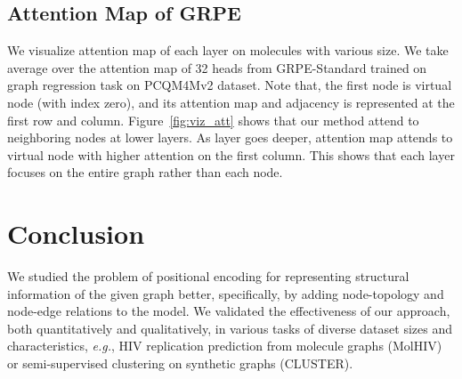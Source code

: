 \documentclass[letterpaper]{article} \usepackage{aaai23}  \usepackage{times}  \usepackage{helvet}  \usepackage{courier}  \usepackage[hyphens]{url}  \usepackage{graphicx} \urlstyle{rm} \def\UrlFont{\rm}  \usepackage{natbib}  \usepackage{caption} \frenchspacing  \setlength{\pdfpagewidth}{8.5in} \setlength{\pdfpageheight}{11in} \usepackage{algorithm}
\newcommand{\eg}{\textit{e.g.}}
\begin{document}
\subsection{Attention Map of GRPE} We visualize attention map of each layer on molecules with various size. We take average over the attention map of 32 heads from GRPE-Standard trained on graph regression task on PCQM4Mv2 dataset.
Note that, the first node is virtual node (with index zero), and its attention map and adjacency is represented at the first row and column.
Figure~\ref{fig:viz_att} shows that our method attend to neighboring nodes at lower layers. 
As layer goes deeper, attention map attends to virtual node with higher attention on the first column.
This shows that each layer focuses on the entire graph rather than each node.

 \section{Conclusion}
We studied the problem of positional encoding for representing structural information of the given graph better, specifically, by adding node-topology and node-edge relations to the model.
We validated the effectiveness of our approach, both quantitatively and qualitatively, in various tasks of diverse dataset sizes and characteristics, \eg, HIV replication prediction from molecule graphs (MolHIV) or semi-supervised clustering on synthetic graphs (CLUSTER).


 

\end{document}

